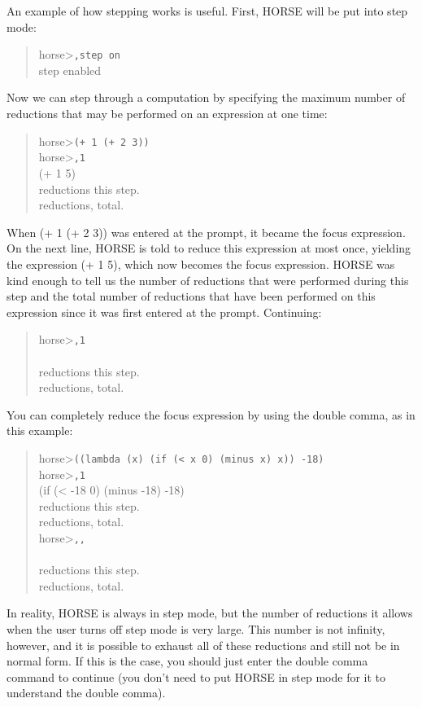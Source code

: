 	An example of how stepping works is useful.  First, HORSE will be put
into step mode:
\begin{quote}
{\samepage
	{\sc horse>}{\tt ,step on}\\
	{\sc step enabled}
}
\end{quote}
Now we can step through a computation by
specifying the maximum number of reductions that may be performed on 
an expression at one time:
\pagebreak
\begin{quote}
{\samepage
	{\sc horse>}{\tt (+ 1 (+ 2 3))}\\
	{\sc horse>}{\tt ,1}\\
	{\sc (+ 1 5)}\\
	{ reductions this step.}\\
	{ reductions, total.}
}
\end{quote}
When  (+ 1 (+ 2 3)) was entered at the prompt, it became the focus
expression.  On the next line, HORSE is told to reduce this expression at
most once, yielding the expression (+ 1 5), which now becomes the
focus expression.  HORSE was kind enough to tell us the number of
reductions that were performed during this step and the total number of
reductions that have been performed on this expression since it was
first entered at the prompt.  Continuing:
\begin{quote}
{\samepage
	{\sc horse>}{\tt ,1}\\
	{}\\
	{ reductions this step.}\\
	{ reductions, total.}
}
\end{quote}
You can completely reduce the focus expression by using the
double comma, as in this example:
\begin{quote}
{\samepage
	{\sc horse>}{\tt ((lambda (x) (if (< x 0) (minus x) x)) -18)}\\
	{\sc horse>}{\tt ,1}\\
	{\sc (if (< -18 0) (minus -18) -18)}\\
	{ reductions this step.}\\
	{ reductions, total.}\\
	{\sc horse>}{\tt ,,}\\
	{}\\
	{ reductions this step.}\\
	{ reductions, total.}
}
\end{quote}

	In reality, HORSE is always in step mode, but the number of
reductions it allows when the user turns off step mode is very large.
This number is not infinity, however, and it is possible to exhaust all
of these reductions and still not be in normal form.  If this is the
case, you should just enter the double comma command to continue  (you
don't need to put HORSE in step mode for it to understand the double comma).

